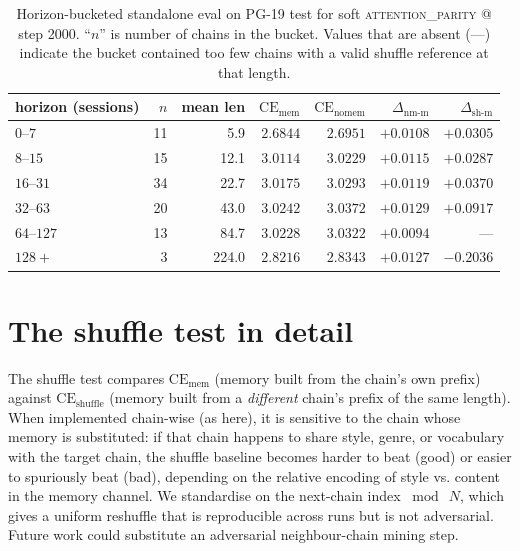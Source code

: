\documentclass{article}
\newcommand{\mhyph}{\text{--}}
\newcommand{\dnm}{\Delta_{\text{nm-m}}}
\newcommand{\dsh}{\Delta_{\text{sh-m}}}
\newcommand{\CEmem}{\mathrm{CE}_{\text{mem}}}
\newcommand{\CEnomem}{\mathrm{CE}_{\text{nomem}}}
\newcommand{\CEsh}{\mathrm{CE}_{\text{shuffle}}}
\begin{document}
\begin{table}[t]
\centering
\caption{Horizon-bucketed standalone eval on PG-19 test for soft
\textsc{attention\_parity} @ step 2000. ``$n$'' is number of chains
in the bucket. Values that are absent (---) indicate the bucket
contained too few chains with a valid shuffle reference at that
length.}
\label{tab:horizon-pg19test}
\small
\begin{tabular}{lrrrrrr}
\toprule
horizon (sessions) & $n$ & mean len & $\CEmem$ & $\CEnomem$ & $\dnm$ & $\dsh$ \\
\midrule
$0\mhyph7$    & 11 & 5.9   & $2.6844$ & $2.6951$ & $+0.0108$ & $+0.0305$ \\
$8\mhyph15$   & 15 & 12.1  & $3.0114$ & $3.0229$ & $+0.0115$ & $+0.0287$ \\
$16\mhyph31$  & 34 & 22.7  & $3.0175$ & $3.0293$ & $+0.0119$ & $+0.0370$ \\
$32\mhyph63$  & 20 & 43.0  & $3.0242$ & $3.0372$ & $+0.0129$ & $+0.0917$ \\
$64\mhyph127$ & 13 & 84.7  & $3.0228$ & $3.0322$ & $+0.0094$ & --- \\
$128+$        & 3  & 224.0 & $2.8216$ & $2.8343$ & $+0.0127$ & $-0.2036$ \\
\bottomrule
\end{tabular}
\end{table}

\section{The shuffle test in detail}
\label{app:shuffle}

The shuffle test compares $\CEmem$ (memory built from the chain's
own prefix) against $\CEsh$ (memory built from a \emph{different}
chain's prefix of the same length). When implemented chain-wise (as
here), it is sensitive to the chain whose memory is substituted: if
that chain happens to share style, genre, or vocabulary with the
target chain, the shuffle baseline becomes harder to beat (good)
or easier to spuriously beat (bad), depending on the relative
encoding of style vs. content in the memory channel. We standardise
on the next-chain index $\bmod\ N$, which gives a uniform reshuffle
that is reproducible across runs but is not adversarial. Future
work could substitute an adversarial neighbour-chain mining step.
\end{document}
